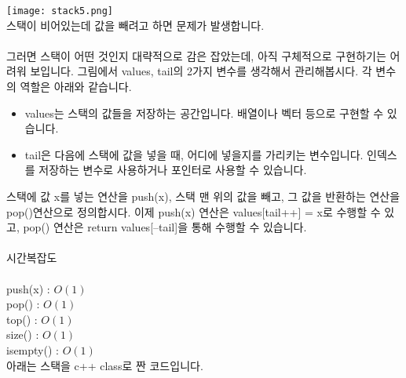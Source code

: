 \documentclass{article}
\begin{document}
\texttt{[image: stack5.png]}\\
스택이 비어있는데 값을 빼려고 하면 문제가 발생합니다.\\\\

\noindent 그러면 스택이 어떤 것인지 대략적으로 감은 잡았는데, 아직 구체적으로 구현하기는 어려워 보입니다. 그림에서 values, tail의 2가지 변수를 생각해서 관리해봅시다. 각 변수의 역할은 아래와 같습니다.

\begin{itemize}
    \item values는 스택의 값들을 저장하는 공간입니다. 배열이나 벡터 등으로 구현할 수 있습니다.
    \item tail은 다음에 스택에 값을 넣을 때, 어디에 넣을지를 가리키는 변수입니다. 인덱스를 저장하는 변수로 사용하거나 포인터로 사용할 수 있습니다.
\end{itemize}

\noindent 스택에 값 x를 넣는 연산을 push(x), 스택 맨 위의 값을 빼고, 그 값을 반환하는 연산을 pop()연산으로 정의합시다. 이제 push(x) 연산은 values[tail++] = x로 수행할 수 있고, pop() 연산은 return values[--tail]을 통해 수행할 수 있습니다.\\\\

\noindent 시간복잡도\\\\
push(x) : $O(1)$\\
pop() : $O(1)$\\
top() : $O(1)$\\
size() : $O(1)$\\
isempty() : $O(1)$\\

\noindent 아래는 스택을 c++ class로 짠 코드입니다.\\
\end{document}
